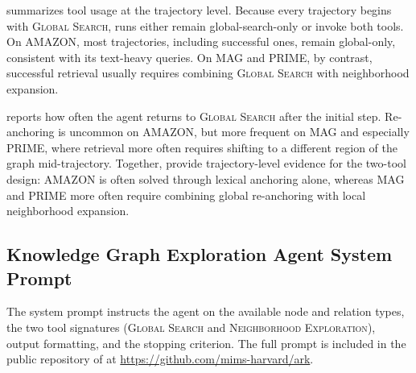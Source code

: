 \noindent {} summarizes tool usage at the trajectory level. Because every trajectory begins with \textsc{Global Search}, runs either remain global-search-only or invoke both tools. On AMAZON, most trajectories, including successful ones, remain global-only, consistent with its text-heavy queries. On MAG and PRIME, by contrast, successful retrieval usually requires combining \textsc{Global Search} with neighborhood expansion.

\TabGlobalAfterFirstStep[h]

\noindent {} reports how often the agent returns to \textsc{Global Search} after the initial step. Re-anchoring is uncommon on AMAZON, but more frequent on MAG and especially PRIME, where retrieval more often requires shifting to a different region of the graph mid-trajectory. Together,  provide trajectory-level evidence for the two-tool design: AMAZON is often solved through lexical anchoring alone, whereas MAG and PRIME more often require combining global re-anchoring with local neighborhood expansion.

\subsection{Knowledge Graph Exploration Agent System Prompt}

The system prompt instructs the agent on the available node and relation types, the two tool signatures (\textsc{Global Search} and \textsc{Neighborhood Exploration}), output formatting, and the stopping criterion. The full prompt is included in the public repository of \retrieverShort at \url{https://github.com/mims-harvard/ark}.

\clearpage
